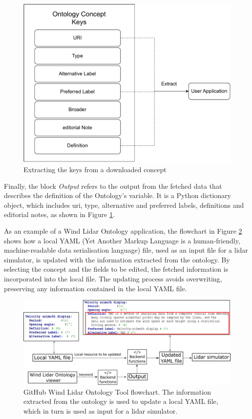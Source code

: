 \documentclass[remotesensing,article,submit,pdftex,moreauthors]{Definitions/mdpi}
\begin{document}
\begin{figure}[htpb!]
    \centering
    \includegraphics[width=\textwidth]{Figures/extract_keys.pdf}
    \caption{Extracting the keys from a downloaded concept}
    \label{fig:extract_keys}
\end{figure}

Finally, the block \textit{Output} refers to the output from the fetched data that describes the definition of the Ontology's variable. It is a Python dictionary object, which includes uri, type, alternative and preferred labels, definitions and editorial notes, as shown in Figure \ref{fig:extract_keys}.

As an example of a Wind Lidar Ontology application, the flowchart in Figure \ref{fig:workflow_GHT} shows how a local YAML (Yet Another Markup Language is a human-friendly, machine-readable data serialisation language) file, used as an input file for a lidar simulator, is updated with the information extracted from the ontology. By selecting the concept and the fields to be edited, the fetched information is incorporated into the local file. The updating process avoids overwriting, preserving any information contained in the local YAML file.

\begin{figure}[htpb!]
    \centering
    \includegraphics[width=\textwidth]{Figures/flowchart_GH_Tool.png}
    \caption{GitHub Wind Lidar Ontology Tool flowchart. The information extracted from the ontology is used to update a local YAML file, which in turn is used as input for a lidar simulator.  }
    \label{fig:workflow_GHT}
\end{figure}
\end{document}
